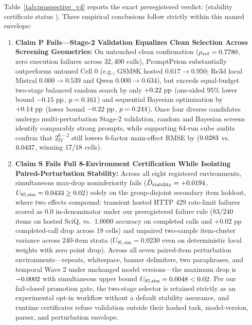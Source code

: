 \documentclass[11pt,a4paper]{article}
\newcommand{\method}{PromptPrism}
\begin{document}
Table~\ref{tab:prospective_v4} reports the exact preregistered verdict: \textbf{\RealVFourVerdictCode{}} (stability certificate status \RealVFourCertStatus{}). Three empirical conclusions follow strictly within this named envelope:
\begin{enumerate}[leftmargin=*,nosep]
    \item \textbf{Claim P Fails—Stage-2 Validation Equalizes Clean Selection Across Screening Geometries:} On untouched clean confirmation ($\mu_{\mathrm{ref}} = 0.7780{}$, zero execution failures across $32{,}400$ calls), \method{} substantially outperforms untuned Cell 0 (e.g., GSM8K hosted $0.617 \to 0.950$; Re3d local Mistral $0.000 \to 0.539$ and Qwen $0.000 \to 0.634$), but exceeds equal-budget two-stage balanced random search by only $+0.22{}\text{ pp}$ (one-sided 95\% lower bound $-0.15{}\text{ pp}$, $p=0.161{}$) and sequential Bayesian optimization by $+0.14{}\text{ pp}$ (lower bound $-0.22{}\text{ pp}$, $p=0.244{}$). Once four diverse candidates undergo multi-perturbation Stage-2 validation, random and Bayesian screens identify comparably strong prompts, while supporting $64$-run cube audits confirm that $2^{6-2}_{\mathrm{IV}}$ still lowers 6-factor main-effect RMSE by \RealVFourEffReductionPct{} ($0.0283{}$ vs.\ $0.0437{}$, winning $17{}/18$ cells).
    \item \textbf{Claim S Fails Full 8-Environment Certification While Isolating Paired-Perturbation Stability:} Across all eight registered environments, simultaneous max-drop noninferiority fails ($\hat{D}_{\mathrm{stability}} = +0.0194{}$, $U_{95,\mathrm{sim}} = 0.0433{} \ge 0.02$) solely on the group-disjoint secondary item holdout, where two effects compound: \RealVFourTerminalFailures{} transient hosted HTTP 429 rate-limit failures scored as $0.0$ in-denominator under our preregistered failure rule ($83/240$ items on hosted SciQ, vs.\ $1.0000$ accuracy on completed calls and $+0.02\text{ pp}$ completed-call drop across 18 cells) and unpaired two-sample item-cluster variance across 240-item strata ($U_{95,\mathrm{sim}} = 0.0230$ even on deterministic local weights with zero point drop). Across all seven paired-item perturbation environments—repeats, whitespace, banner delimiters, two paraphrases, and temporal Wave 2 under unchanged model versions—the maximum drop is $-0.0002{}$ with simultaneous upper bound $U_{95,\mathrm{sim}} = 0.0048{} < 0.02$. Per our fail-closed promotion gate, the two-stage selector is retained strictly as an experimental opt-in workflow without a default stability assurance, and runtime certificates refuse validation outside their hashed task, model-version, parser, and perturbation envelope.
\end{enumerate}
\end{document}
